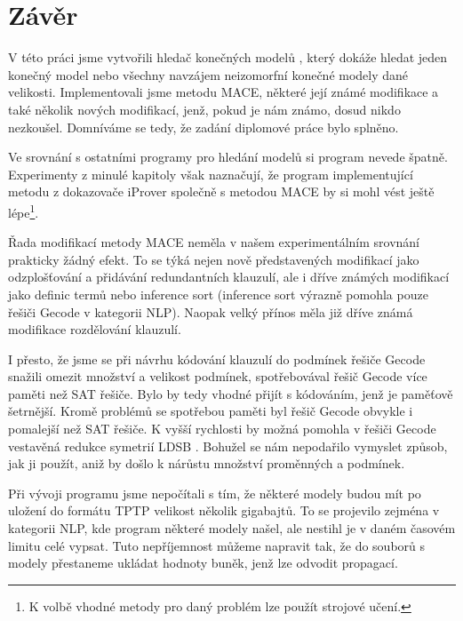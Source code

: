 \chapter{Závěr}

V této práci jsme vytvořili hledač konečných modelů \crossbow{},
který dokáže hledat jeden konečný model nebo všechny navzájem
neizomorfní konečné modely dané velikosti.
Implementovali jsme metodu MACE, některé její známé modifikace
a také několik nových modifikací, jenž, pokud je nám
známo, dosud nikdo nezkoušel.
Domníváme se tedy, že zadání diplomové práce bylo splněno.

Ve srovnání s ostatními programy pro hledání modelů si program \crossbow{}
nevede špatně. Experimenty z minulé kapitoly však naznačují,
že program implementující metodu z dokazovače iProver společně
s metodou MACE by si mohl vést ještě lépe\footnote{K volbě
vhodné metody pro daný problém lze použít strojové učení.}.

Řada modifikací metody MACE neměla v našem experimentálním
srovnání prakticky žádný efekt. To se týká nejen nově představených
modifikací jako odzplošťování a přidávání redundantních klauzulí,
ale i dříve známých modifikací jako definic termů nebo inference sort
(inference sort výrazně pomohla pouze řešiči Gecode v kategorii NLP).
Naopak velký přínos měla již dříve známá modifikace rozdělování klauzulí.

I přesto, že jsme se při návrhu kódování klauzulí
do podmínek řešiče Gecode snažili omezit množství a velikost podmínek,
spotřebovával řešič Gecode více paměti než SAT řešiče.
Bylo by tedy vhodné přijít s kódováním,
jenž je paměťově šetrnější.
Kromě problémů se spotřebou paměti byl
řešič Gecode obvykle i pomalejší než SAT řešiče.
K vyšší rychlosti by možná pomohla
v řešiči Gecode vestavěná redukce symetrií LDSB \cite{ldsb}.
Bohužel se nám nepodařilo vymyslet způsob,
jak ji použít, aniž by došlo k nárůstu
množství proměnných a podmínek.

Při vývoji programu \crossbow{} jsme nepočítali s tím,
že některé modely budou mít po uložení do formátu TPTP
velikost několik gigabajtů. To se projevilo zejména v kategorii
NLP, kde program \crossbow{} některé modely našel,
ale nestihl je v daném časovém limitu celé vypsat.
Tuto nepříjemnost můžeme napravit tak, že do
souborů s modely přestaneme ukládat hodnoty buněk,
jenž lze odvodit propagací.


